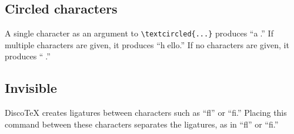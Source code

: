 \documentclass[11pt]{article}
\newcommand{\DiscoTeX}[1]{Disco\TeX}
\begin{document}
\subsection{Circled characters} A single character as an argument to \verb|\textcircled{...}| produces ``\textcircled{a}.'' If multiple characters are given, it produces ``\textcircled{hello}.'' If no characters are given, it produces ``\textcircled{}.''

    \subsection{Invisible}
\DiscoTeX{} creates ligatures between characters such as ``fl'' or ``fi.'' Placing this command between these characters separates the ligatures, as in ``f\textcompwordmark l'' or ``f\textcompwordmark i.''
\end{document}
